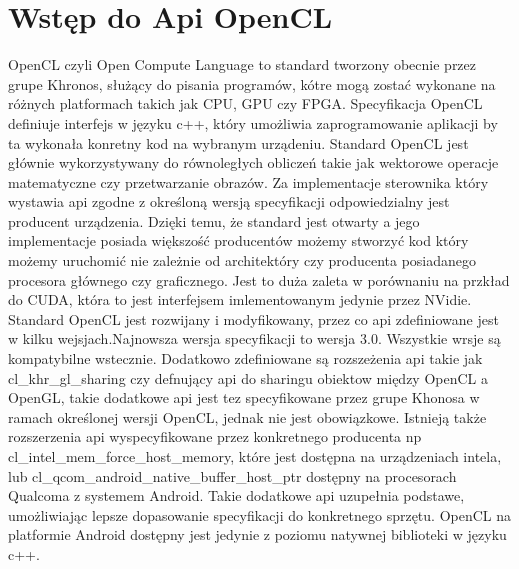 \section[Wstęp do Api OpenCL]{Wstęp do Api OpenCL}
OpenCL czyli Open Compute Language to standard tworzony obecnie przez grupe Khronos, służący do pisania programów, kótre mogą zostać wykonane na różnych platformach takich jak CPU, GPU czy FPGA. Specyfikacja OpenCL definiuje interfejs w języku c++, który umożliwia zaprogramowanie aplikacji by ta wykonała konretny kod na wybranym urządeniu. Standard OpenCL jest głównie wykorzystywany do równoległych obliczeń takie jak wektorowe operacje matematyczne czy przetwarzanie obrazów. Za implementacje sterownika który wystawia api zgodne z określoną wersją specyfikacji odpowiedzialny jest producent urządzenia.  Dzięki temu, że standard jest otwarty a jego implementacje posiada większość producentów możemy stworzyć kod który możemy uruchomić nie zależnie od architektóry czy producenta posiadanego procesora głównego czy graficznego. Jest to duża zaleta w porównaniu na przkład do CUDA, która to jest interfejsem imlementowanym jedynie przez NVidie. Standard OpenCL jest rozwijany i modyfikowany, przez co api zdefiniowane jest w kilku wejsjach.Najnowsza wersja specyfikacji to wersja 3.0. Wszystkie wrsje są kompatybilne wstecznie. Dodatkowo zdefiniowane są rozszeżenia api takie jak cl\_khr\_gl\_sharing czy defnujący api do sharingu obiektow między OpenCL a OpenGL, takie dodatkowe api jest tez specyfikowane przez grupe Khonosa w ramach określonej wersji OpenCL, jednak nie jest obowiązkowe. Istnieją także rozszerzenia api wyspecyfikowane przez konkretnego producenta np cl\_intel\_mem\_force\_host\_memory, które jest dostępna na urządzeniach intela, lub cl\_qcom\_android\_native\_buffer\_host\_ptr dostępny na procesorach Qualcoma z systemem Android. Takie dodatkowe api uzupełnia podstawe, umożliwiając lepsze dopasowanie specyfikacji do konkretnego sprzętu. OpenCL na platformie Android dostępny jest jedynie z poziomu natywnej biblioteki w języku c++.

\label{chap:goal}
